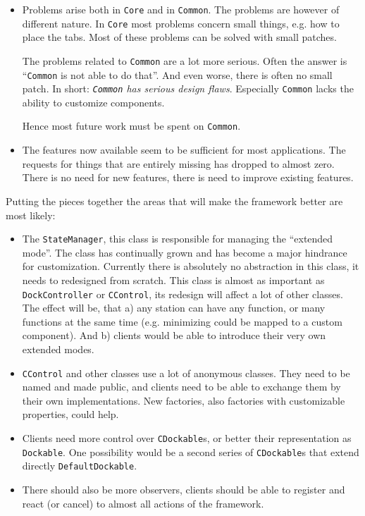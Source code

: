 \documentclass[a4paper,10pt]{article}
\newcommand{\src}[1]{\texttt{#1}}
\begin{document}
\begin{itemize}
 \item Problems arise both in \src{Core} and in \src{Common}. The problems are however of different nature. In \src{Core} most problems concern small things, e.g. how to place the tabs. Most of these problems can be solved with small patches. 
 
 The problems related to \src{Common} are a lot more serious. Often the answer is ``\src{Common} is not able to do that''. And even worse, there is often no small patch. In short: \textit{\src{Common} has serious design flaws}. Especially \src{Common} lacks the ability to customize components.
 
 Hence most future work must be spent on \src{Common}.
 
 \item The features now available seem to be sufficient for most applications. The requests for things that are entirely missing has dropped to almost zero. There is no need for new features, there is need to improve existing features.
\end{itemize}

Putting the pieces together the areas that will make the framework better are most likely:
\begin{itemize}
 \item The \src{StateManager}, this class is responsible for managing the ``extended mode''. The class has continually grown and has become a major hindrance for customization. Currently there is absolutely no abstraction in this class, it needs to redesigned from scratch. This class is almost as important as \src{DockController} or \src{CControl}, its redesign will affect a lot of other classes. The effect will be, that a) any station can have any function, or many functions at the same time (e.g. minimizing could be mapped to a custom component). And b) clients would be able to introduce their very own extended modes.
 \item \src{CControl} and other classes use a lot of anonymous classes. They need to be named and made public, and clients need to be able to exchange them by their own implementations. New factories, also factories with customizable properties, could help.
 \item Clients need more control over \src{CDockable}s, or better their representation as \src{Dockable}. One possibility would be a second series of \src{CDockable}s that extend directly \src{DefaultDockable}.
 \item There should also be more observers, clients should be able to register and react (or cancel) to almost all actions of the framework.
\end{itemize}
\end{document}
